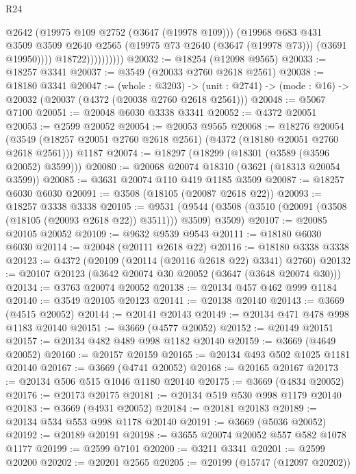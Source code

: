 \begin{lexlean}{R24}
\begin{coremodule}
                            @2642
                            (@19975 @109 @2752 (@3647 (@19978 @109)))
                            (@19968
                              @683
                              @431
                              @3509
                              @3509
                              @2640
                              @2565
                              (@19975 @73 @2640 (@3647 (@19978 @73)))
                              (@3691 @19950))))
                        @18722))))))))))
@20032 := @18254 (@12098 @9565)
@20033 := @18257 @3341
@20037 := @3549 (@20033 @2760 @2618 @2561)
@20038 := @18180 @3341
@20047 := (whole : @3203) ->
  (unit : @2741) -> (mode : @16) -> @20032 (@20037 (@4372 (@20038 @2760 @2618 @2561)))
@20048 := @5067 @7100
@20051 := @20048 @6030 @3338 @3341
@20052 := @4372 @20051
@20053 := @2599 @20052
@20054 := @20053 @9565
@20068 := @18276
    @20054
    (@3549 (@18257 @20051 @2760 @2618 @2561) (@4372 (@18180 @20051 @2760 @2618 @2561)))
    @1187
@20074 := @18297 (@18299 (@18301 (@3589 (@3596 @20052) @3599)))
@20080 := @20068 @20074 @18310 (@3621 (@18313 @20054 @3599))
@20085 := @3631 @20074 @110 @419 @1185 @3509
@20087 := @18257 @6030 @6030
@20091 := @3508 (@18105 (@20087 @2618 @22))
@20093 := @18257 @3338 @3338
@20105 := @9531
    (@9544 (@3508 (@3510 (@20091 (@3508 (@18105 (@20093 @2618 @22)) @3511))) @3509) @3509)
@20107 := @20085 @20105 @20052
@20109 := @9632 @9539 @9543
@20111 := @18180 @6030 @6030
@20114 := @20048 (@20111 @2618 @22)
@20116 := @18180 @3338 @3338
@20123 := @4372 (@20109 (@20114 (@20116 @2618 @22) @3341) @2760)
@20132 := @20107 @20123 (@3642 @20074 @30 @20052 (@3647 (@3648 @20074 @30)))
@20134 := @3763 @20074 @20052
@20138 := @20134 @457 @462 @999 @1184
@20140 := @3549 @20105 @20123
@20141 := @20138 @20140
@20143 := @3669 (@4515 @20052)
@20144 := @20141 @20143
@20149 := @20134 @471 @478 @998 @1183 @20140
@20151 := @3669 (@4577 @20052)
@20152 := @20149 @20151
@20157 := @20134 @482 @489 @998 @1182 @20140
@20159 := @3669 (@4649 @20052)
@20160 := @20157 @20159
@20165 := @20134 @493 @502 @1025 @1181 @20140
@20167 := @3669 (@4741 @20052)
@20168 := @20165 @20167
@20173 := @20134 @506 @515 @1046 @1180 @20140
@20175 := @3669 (@4834 @20052)
@20176 := @20173 @20175
@20181 := @20134 @519 @530 @998 @1179 @20140
@20183 := @3669 (@4931 @20052)
@20184 := @20181 @20183
@20189 := @20134 @534 @553 @998 @1178 @20140
@20191 := @3669 (@5036 @20052)
@20192 := @20189 @20191
@20198 := @3655 @20074 @20052 @557 @582 @1078 @1177
@20199 := @2599 @7101
@20200 := @3211 @3341
@20201 := @2599 @20200
@20202 := @20201 @2565
@20205 := @20199 (@15747 (@12097 @20202))

\end{coremodule}
\end{lexlean}
